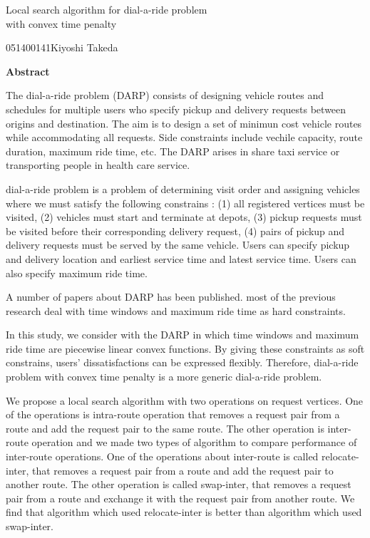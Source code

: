 

\newpage
\begin{center}{\LARGE Local  search algorithm for dial-a-ride problem\\ with convex time penalty}\\[0.5cm]
\end{center}
\hfill {\large 051400141\qquad Kiyoshi Takeda}\\[0.5cm]
\begin{center}
{\large \bf Abstract}\\
\end{center}
The dial-a-ride problem (DARP) consists of designing vehicle routes and schedules for multiple users who specify pickup and delivery requests between origins and destination. The aim is to design a set of minimun cost vehicle routes while accommodating all requests. Side constraints include vechile capacity, route duration, maximum ride time, etc. The DARP arises in share taxi service or transporting people in health care service.

dial-a-ride problem is a problem of determining visit order and assigning vehicles where we must satisfy the following constrains : (1) all registered vertices must be visited, (2) vehicles must start and terminate at depots, (3) pickup requests must be visited before their corresponding delivery request, (4) pairs of pickup and delivery requests must be served by the same vehicle.  Users can specify pickup and delivery location and earliest service time and latest service time. Users can also specify maximum ride time.

A number of papers about DARP has been published. most of the previous research deal with time windows and maximum ride time as hard constraints.

In this study, we consider with the DARP in which time windows and maximum ride time are piecewise linear convex functions. By giving these constraints as soft constrains, users' dissatisfactions can be expressed flexibly. Therefore, dial-a-ride problem with convex time penalty is a more generic dial-a-ride problem.

We propose a local search algorithm with two operations on request vertices. One of the operations is intra-route operation that removes a request pair from a route and add the request pair to the same route. The other operation is inter-route operation and we made two types of algorithm to compare performance of inter-route operations.
One of the operations about inter-route is called relocate-inter, that removes a request pair from a route and add the request pair to another route. The other operation is called swap-inter, that removes a request pair from a route and exchange it with the request pair from another route.
We find that algorithm which used relocate-inter is better than algorithm which used swap-inter.

